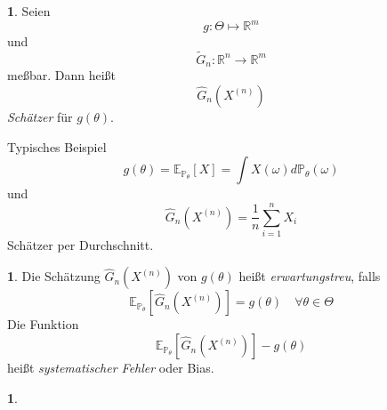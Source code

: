 \documentclass[10pt,a4paper]{report}
\numberwithin{equation}{section}
\numberwithin{figure}{section}
\theoremstyle{plain}
\theoremstyle{definition}
\newtheorem{defn}[thm]{\protect\definitionname}
\newtheorem{example}[thm]{\protect\examplename}
\theoremstyle{remark}
\theoremstyle{plain}
\providecommand{\definitionname}{Definition}
\providecommand{\examplename}{Beispiel}
\newcommand{\1}{ \mathbb{1} } %
\begin{document}
\begin{defn}
Seien 
\[
g:\Theta\mapsto\mathbb{R}^{m}
\]
und
\[
\tilde{G}_{n}:\mathbb{R}^{n}\to\mathbb{R}^{m}
\]
meßbar. Dann heißt
\[
\hat{G}_{n}\left(X^{\left(n\right)}\right)
\]
\emph{Schätzer} für $g\left(\theta\right)$.
\end{defn}
Typisches Beispiel
\[
g\left(\theta\right)=\mathbb{E}_{\mathbb{P}_{\theta}}\left[X\right]=\int X\left(\omega\right)d\mathbb{P}_{\theta}\left(\omega\right)
\]
und
\[
\hat{G}_{n}\left(X^{\left(n\right)}\right)=\frac{1}{n}\sum_{i=1}^{n}X_{i}
\]
Schätzer per Durchschnitt.
\begin{defn}
Die Schätzung $\hat{G}_{n}\left(X^{\left(n\right)}\right)$ von $g\left(\theta\right)$
heißt \emph{erwartungstreu}, falls 
\[
\mathbb{E}_{\mathbb{P}_{\theta}}\left[\hat{G}_{n}\left(X^{\left(n\right)}\right)\right]=g\left(\theta\right)\quad\forall\theta\in\Theta
\]
Die Funktion 
\[
\mathbb{E}_{\mathbb{P}_{\theta}}\left[\hat{G}_{n}\left(X^{\left(n\right)}\right)\right]-g\left(\theta\right)
\]
heißt \emph{systematischer Fehler} oder
Bias.\end{defn}
\begin{example}
 \  \label{BSP33}\end{example}
\end{document}
